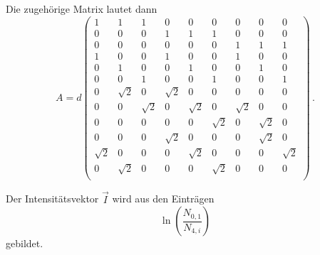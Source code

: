 Die zugehörige Matrix lautet dann
\begin{equation}
  A= d
  \left(
  \begin{array}{rrrrrrrrr}
    1 & 1 & 1 & 0 & 0 & 0 & 0 & 0 & 0 \\
    0 & 0 & 0 & 1 & 1 & 1 & 0 & 0 & 0 \\
    0 & 0 & 0 & 0 & 0 & 0 & 1 & 1 & 1 \\
    1 & 0 & 0 & 1 & 0 & 0 & 1 & 0 & 0 \\
    0 & 1 & 0 & 0 & 1 & 0 & 0 & 1 & 0 \\
    0 & 0 & 1 & 0 & 0 & 1 & 0 & 0 & 1 \\
    0 & \sqrt{2} & 0 & \sqrt{2} & 0 & 0 & 0 & 0 & 0 \\
    0 & 0 & \sqrt{2} & 0 & \sqrt{2} & 0 & \sqrt{2} & 0 & 0 \\
    0 & 0 & 0 & 0 & 0 & \sqrt{2} & 0 & \sqrt{2} & 0 \\
    0 & 0 & 0 & \sqrt{2} & 0 & 0 & 0 & \sqrt{2} & 0 \\
    \sqrt{2} & 0 & 0 & 0 & \sqrt{2} & 0 & 0 & 0 & \sqrt{2} \\
    0 & \sqrt{2} & 0 & 0 & 0 & \sqrt{2} & 0 & 0 & 0 \\
  \end{array}
  \right)\,.
\end{equation}

Der Intensitätsvektor $\vec{I}$ wird aus den Einträgen
\begin{equation*}
  \ln\left(\frac{N_{0,1}}{N_{4,i}}\right)
\end{equation*}
gebildet.

